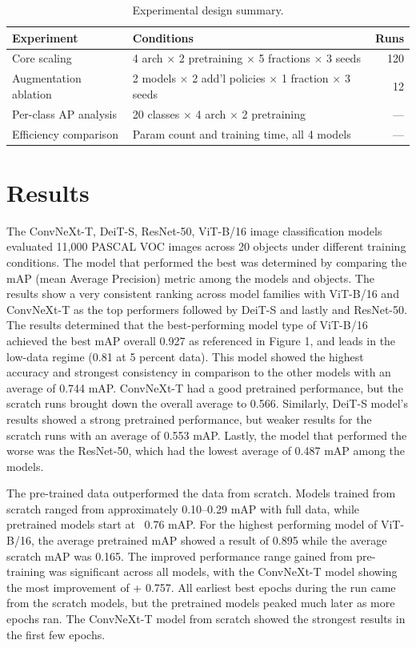 \documentclass{article}
\begin{document}
\begin{table}[h]
\centering
\caption{Experimental design summary.}
\smallskip
\begin{tabular}{llr}
\toprule
\textbf{Experiment} & \textbf{Conditions} & \textbf{Runs} \\
\midrule
Core scaling        & 4 arch $\times$ 2 pretraining $\times$ 5 fractions $\times$ 3 seeds & 120 \\
Augmentation ablation & 2 models $\times$ 2 add'l policies $\times$ 1 fraction $\times$ 3 seeds & 12  \\
Per-class AP analysis & 20 classes $\times$ 4 arch $\times$ 2 pretraining                          & --- \\
Efficiency comparison & Param count and training time, all 4 models                                  & --- \\
\bottomrule
\end{tabular}
\label{tab:experiments}
\end{table}


\section{Results}

The ConvNeXt-T, DeiT-S, ResNet-50, ViT-B/16 image classification models evaluated 11,000 PASCAL VOC images across 20 objects under different training conditions. The model that performed the best was determined by comparing the mAP (mean Average Precision) metric among the models and objects. The results show a very consistent ranking across model families with ViT-B/16 and ConvNeXt-T as the top performers followed by DeiT-S and lastly and ResNet-50. The results determined that the best-performing model type of ViT-B/16 achieved the best mAP overall 0.927 as referenced in Figure 1, and leads in the low-data regime (0.81 at 5 percent data). This model showed the highest accuracy and strongest consistency in comparison to the other models with an average of 0.744 mAP. ConvNeXt-T had a good pretrained performance, but the scratch runs brought down the overall average to 0.566. Similarly, DeiT-S model’s results showed a strong pretrained performance, but weaker results for the scratch runs with an average of 0.553 mAP. Lastly, the model that performed the worse was the ResNet-50, which had the lowest average of 0.487 mAP among the models.

The pre-trained data outperformed the data from scratch. Models trained from scratch ranged from approximately 0.10–0.29 mAP with full data, while pretrained models start at ~0.76 mAP. For the highest performing model of ViT-B/16, the average pretrained mAP showed a result of 0.895 while the average scratch mAP was 0.165. The improved performance range gained from pre-training was significant across all models, with the ConvNeXt-T model showing the most improvement of + 0.757. All earliest best epochs during the run came from the scratch models, but the pretrained models peaked much later as more epochs ran. The ConvNeXt-T model from scratch showed the strongest results in the first few epochs.
\end{document}
